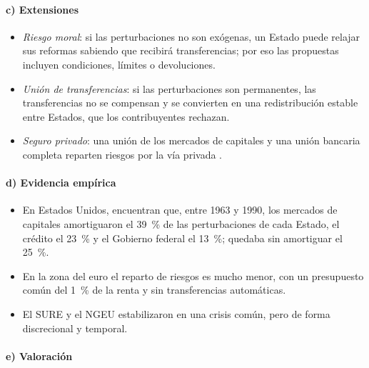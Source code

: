 \documentclass[11pt]{article}
\begin{document}
\paragraph{c) Extensiones}

\begin{itemize}
\item \emph{Riesgo moral}: si las perturbaciones no son exógenas, un Estado puede relajar sus reformas sabiendo que recibirá transferencias; por eso las propuestas incluyen condiciones, límites o devoluciones.
\item \emph{Unión de transferencias}: si las perturbaciones son permanentes, las transferencias no se compensan y se convierten en una redistribución estable entre Estados, que los contribuyentes rechazan.
\item \emph{Seguro privado}: una unión de los mercados de capitales y una unión bancaria completa reparten riesgos por la vía privada .
\end{itemize}

\paragraph{d) Evidencia empírica}

\begin{itemize}
\item En Estados Unidos, \textcite{AsdrubaliSorensenYosha1996} encuentran que, entre 1963 y 1990, los mercados de capitales amortiguaron el 39~\% de las perturbaciones de cada Estado, el crédito el 23~\% y el Gobierno federal el 13~\%; quedaba sin amortiguar el 25~\%.
\item En la zona del euro el reparto de riesgos es mucho menor, con un presupuesto común del 1~\% de la renta y sin transferencias automáticas.
\item El SURE y el NGEU estabilizaron en una crisis común, pero de forma discrecional y temporal.
\end{itemize}

\paragraph{e) Valoración}
\end{document}
